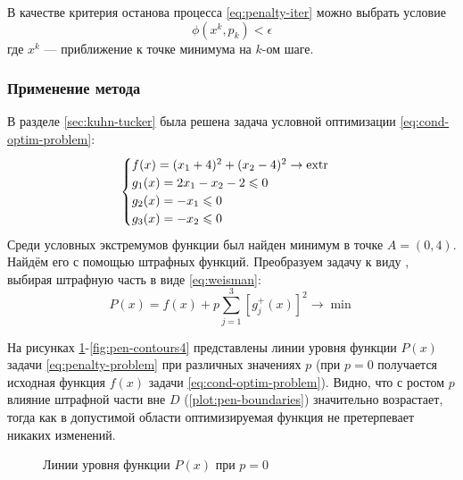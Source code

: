 В качестве критерия останова процесса \eqref{eq:penalty-iter} можно
выбрать условие
\begin{equation*}
  \phi(x^k, p_k) < \epsilon
\end{equation*}
где $x^k$ — приближение к точке минимума на $k$-ом шаге.

\subsubsection{Применение метода}
\label{sec:penalty-usage}

В разделе \ref{sec:kuhn-tucker} была решена задача условной
оптимизации \eqref{eq:cond-optim-problem}:
\begin{equation*}
  \begin{cases}
    f(x) = (x_1+4)^2 + (x_2-4)^2 \to \operatorname{extr} \\
    g_1(x) = 2x_1 - x_2 - 2 \leqslant 0 \\
    g_2(x) = -x_1 \leqslant 0 \\
    g_3(x) = -x_2 \leqslant 0
  \end{cases}
\end{equation*}
Среди условных экстремумов функции был найден минимум в точке $A = (0,
4)$. Найдём его с помощью штрафных функций. Преобразуем задачу к виду
\label{eq:penalty-iter}, выбирая штрафную часть в виде
\eqref{eq:weisman}:
\begin{equation}
  \label{eq:penalty-problem}
  P(x) = f(x) + p \sum_{j=1}^3{ \left [ g_j^+(x) \right ]^2} \to \min
\end{equation}

На рисунках \ref{fig:pen-contours1}-\ref{fig:pen-contours4}
представлены линии уровня функции $P(x)$ задачи
\eqref{eq:penalty-problem} при различных значениях $p$ (при $p=0$
получается исходная функция $f(x)$ задачи
\eqref{eq:cond-optim-problem}). Видно, что с ростом $p$ влияние
штрафной части вне $D$ (\ref{plot:pen-boundaries}) значительно
возрастает, тогда как в допустимой области оптимизируемая функция не
претерпевает никаких изменений.

\begin{figure}[!thb]
  \centering
  \caption{Линии уровня функции $P(x)$ при $p=0$}
  \label{fig:pen-contours1}
\end{figure}

